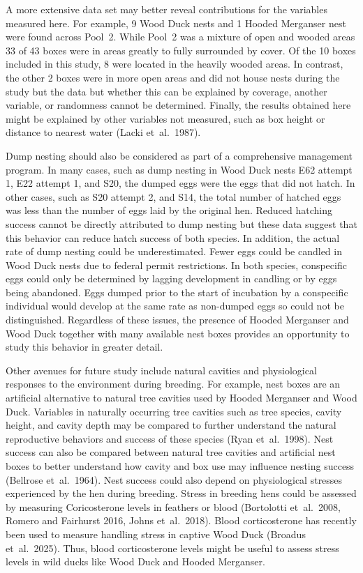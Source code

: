 A more extensive data set may better reveal contributions for the variables measured here. For example, 9 Wood Duck nests and 1 Hooded Merganser nest were found across Pool~2. While Pool~2 was a mixture of open and wooded areas 33 of 43 boxes were in areas greatly to fully surrounded by cover. Of the 10 boxes included in this study, 8 were located in the heavily wooded areas. In contrast, the other 2 boxes were in more open areas and did not house nests during the study but the data but whether this can be explained by coverage, another variable, or randomness cannot be determined. Finally, the results obtained here might be explained by other variables not measured, such as box height or distance to nearest water (Lacki et~al.~1987). 

Dump nesting should also be considered as part of a comprehensive management program. In many cases, such as dump nesting in Wood Duck nests E62 attempt 1, E22 attempt 1, and S20, the dumped eggs were the eggs that did not hatch. In other cases, such as S20 attempt 2, and S14, the total number of hatched eggs was less than the number of eggs laid by the original hen. Reduced hatching success cannot be directly attributed to dump nesting but these data suggest that this behavior can reduce hatch success of both species. In addition, the actual rate of dump nesting could be underestimated. Fewer eggs could be candled in Wood Duck nests due to federal permit restrictions. In both species, conspecific eggs could only be determined by lagging development in candling or by eggs being abandoned. Eggs dumped prior to the start of incubation by a conspecific individual would develop at the same rate as non-dumped eggs so could not be distinguished. Regardless of these issues, the presence of Hooded Merganser and Wood Duck together with many available nest boxes provides an opportunity to study this behavior in greater detail.  

Other avenues for future study include natural cavities and physiological responses to the environment during breeding. For example, nest boxes are an artificial alternative to natural tree cavities used by Hooded Merganser and Wood Duck. Variables in naturally occurring tree cavities such as tree species, cavity height, and cavity depth may be compared to further understand the natural reproductive behaviors and success of these species (Ryan et~al.~1998). Nest success can also be compared between natural tree cavities and artificial nest boxes to better understand how cavity and box use may influence nesting success (Bellrose et~al.~1964).  Nest success could also depend on physiological stresses experienced by the hen during breeding. Stress in breeding hens could be assessed by measuring Coricosterone levels in feathers or blood (Bortolotti et~al.~2008, Romero and Fairhurst 2016, Johns et~al.~2018). Blood corticosterone has recently been used to measure handling stress in captive Wood Duck (Broadus et~al.~2025). Thus, blood corticosterone levels might be useful to assess stress levels in wild ducks like Wood Duck and Hooded Merganser.  



